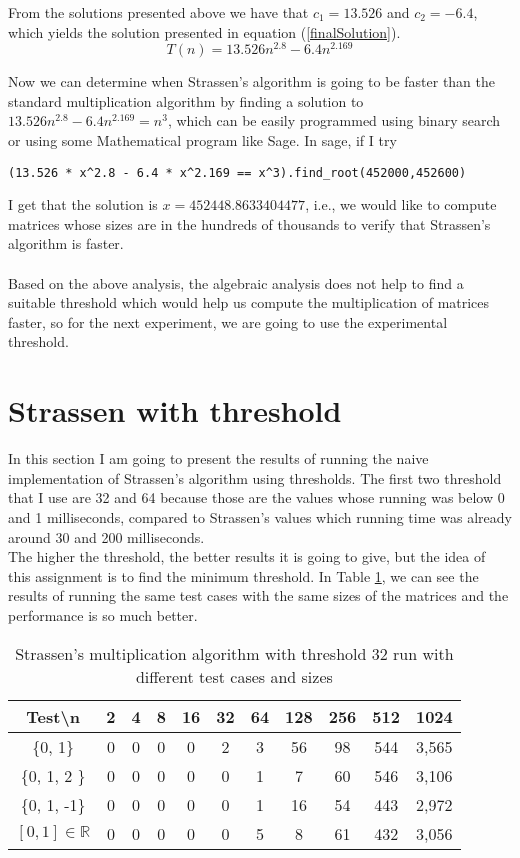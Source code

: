 \documentclass[tikz, 12pt]{scrartcl}
\begin{document}
From the solutions presented above we have that $c_1 = 13.526$ and $c_2 = -6.4$, which yields the solution presented in equation (\ref{finalSolution}).
\begin{equation}\label{finalSolution}
T(n) = 13.526 n^{2.8} - 6.4 n^{2.169}
\end{equation}

Now we can determine when Strassen's algorithm is going to be faster than the standard multiplication algorithm by finding a solution to $13.526 n^{2.8} - 6.4 n^{2.169} = n^3$, which can be easily programmed using binary search or using some Mathematical program like Sage. In sage, if I try 
\begin{verbatim}
(13.526 * x^2.8 - 6.4 * x^2.169 == x^3).find_root(452000,452600)
\end{verbatim}

I get that the solution is $x = 452448.8633404477$, i.e., we would like to compute matrices whose sizes are in the hundreds of thousands to verify that Strassen's algorithm is faster. \\
\\
Based on the above analysis, the algebraic analysis does not help to find a suitable threshold which would help us compute the multiplication of matrices faster, so for the next experiment, we are going to use the experimental threshold.

\section{Strassen with threshold}

In this section I am going to present the results of running the naive implementation of Strassen's algorithm using thresholds. The first two threshold that I use are 32 and 64 because those are the values whose running was below 0 and 1 milliseconds, compared to Strassen's values which running time was already around 30 and 200 milliseconds. \\
The higher the threshold, the better results it is going to give, but the idea of this assignment is to find the minimum threshold. In Table \ref{strassen32}, we can see the results of running the same test cases with the same sizes of the matrices and the performance is so much better. 

\begin{table}[h!]
\caption{Strassen's multiplication algorithm with threshold 32 run with different test cases and sizes\label{strassen32}}
\centering
\begin{tabular}{|c|cccccccccc|}
\hline
Test\textbackslash  n		&	2	&	4	&	8	&	16	&	32	&	64	&	128		&	256		&	512		&	1024\\
\hline
\{0, 1\}				&	0	&	0	&	0	&	0	&	2	&	3	&	56		&	98		&	544		&	3,565\\
\{0, 1, 2 \}				&	0	&	0	&	0	&	0	&	0	&	1	&	7		&	60		&	546		&	3,106\\
\{0, 1, -1\}				&	0	&	0	&	0	&	0	&	0	&	1	&	16		&	54		&	443		&	2,972\\
$[0, 1] \in \mathbb{R}$	&	0	&	0	&	0	&	0	&	0	&	5	&	8		&	61		&	432		&	3,056\\
\hline
\end{tabular}
\end{table}
\end{document}
